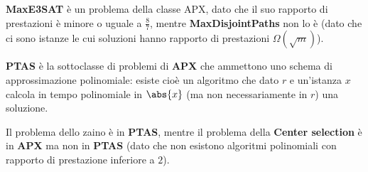 \documentclass[\main/main.tex]{subfiles}
\begin{document}
\begin{multicols}{2}
\begin{definition}[APX]
\end{definition}
\begin{observation}
    \textbf{MaxE3SAT} è un problema della classe APX, dato che il suo rapporto di prestazioni è minore o uguale a \(\frac{8}{7}\), mentre \textbf{MaxDisjointPaths} non lo è (dato che ci sono istanze le cui soluzioni hanno rapporto di prestazioni \(\Omega(\sqrt{m})\)).
\end{observation}
\begin{definition}[PTAS]
    \textbf{PTAS} è la sottoclasse di problemi di \textbf{APX} che ammettono uno schema di approssimazione polinomiale: esiste cioè un algoritmo che dato \(r\) e un'istanza \(x\) calcola in tempo polinomiale in \(\abs{x}\) (ma non necessariamente in \(r\)) una soluzione.
\end{definition}
\begin{observation}
    Il problema dello zaino è in \textbf{PTAS}, mentre il problema della \textbf{Center selection} è in \textbf{APX} ma non in \textbf{PTAS} (dato che non esistono algoritmi polinomiali con rapporto di prestazione inferiore a \(2\)).
\end{observation}
\end{multicols}
\clearpage
\end{document}
